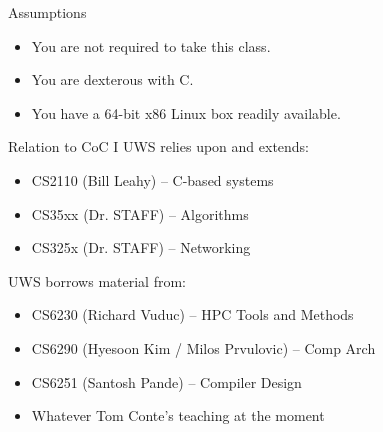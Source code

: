 \documentclass[handout]{beamer}
\begin{document}
\begin{frame}{Assumptions}
\begin{itemize}
\item You are not required to take this class.
\item You are dexterous with C.
\item You have a 64-bit x86 Linux box readily available.
\end{itemize}
\end{frame}

\begin{frame}{Relation to CoC I}
UWS relies upon and extends:
\begin{itemize}
\item CS2110 (Bill Leahy) -- C-based systems
\item CS35xx (Dr. STAFF) -- Algorithms
\item CS325x (Dr. STAFF) -- Networking
\end{itemize}
UWS borrows material from:
\begin{itemize}
\item CS6230 (Richard Vuduc) -- HPC Tools and Methods
\item CS6290 (Hyesoon Kim / Milos Prvulovic) -- Comp Arch
\item CS6251 (Santosh Pande) -- Compiler Design
\item Whatever Tom Conte's teaching at the moment
\end{itemize}
\end{frame}
\end{document}
